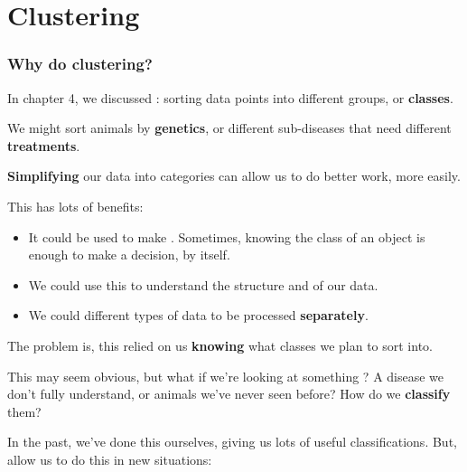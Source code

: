 \setcounter{chapter}{6-1}

\chapter{Clustering}

    \subsection{Why do clustering?}
    
        In chapter 4, we discussed : sorting data points into different groups, or \textbf{classes}. 
        
        \miniex We might sort animals by \textbf{genetics}, or different sub-diseases that need different \textbf{treatments}. 
        
        \textbf{Simplifying} our data into categories can allow us to do better work, more easily.
        
        This has lots of benefits: 
        
        \begin{itemize}
            \item It could be used to make . Sometimes, knowing the class of an object is enough to make a decision, by itself.
        
            \item We could use this to understand the structure and  of our data.
            
            \item We could  different types of data to be processed \textbf{separately}.
        \end{itemize}

        \subsecdiv
        
        The problem is, this relied on us \textbf{knowing} what classes we plan to sort into. 
        
        This may seem obvious, but what if we're looking at something ? A disease we don't fully understand, or animals we've never seen before? How do we \textbf{classify} them?
        
        In the past, we've done this ourselves, giving us lots of useful classifications. But,  allow us to do this in new situations:
        

